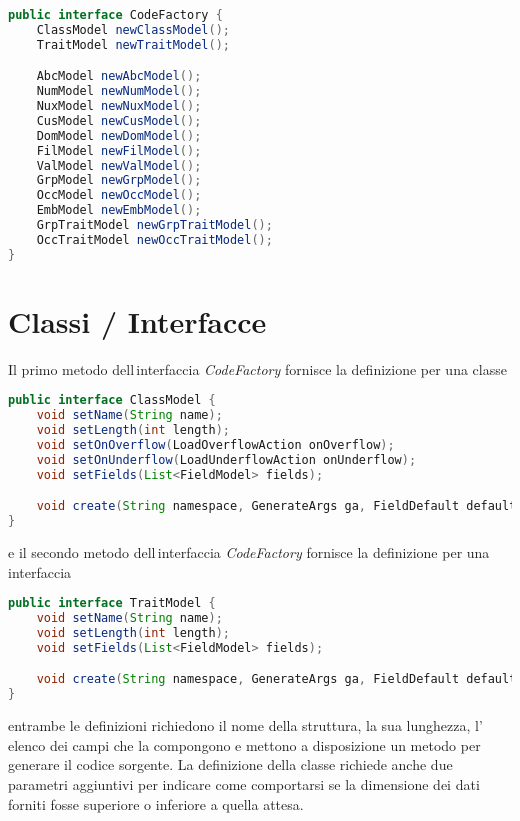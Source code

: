 \documentclass[a4paper,10pt]{report}
\begin{document}
\begin{figure*}[!htb]
\begin{lstlisting}[language=java, caption=interfaccia CodeFactory, 
label=code:CodeFactory]
public interface CodeFactory {
    ClassModel newClassModel();
    TraitModel newTraitModel();

    AbcModel newAbcModel();
    NumModel newNumModel();
    NuxModel newNuxModel();
    CusModel newCusModel();
    DomModel newDomModel();
    FilModel newFilModel();
    ValModel newValModel();
    GrpModel newGrpModel();
    OccModel newOccModel();
    EmbModel newEmbModel();
    GrpTraitModel newGrpTraitModel();
    OccTraitModel newOccTraitModel();
}
\end{lstlisting}
\end{figure*}

\section{Classi / Interfacce}
Il primo metodo dell\,interfaccia \textsl{CodeFactory} fornisce la definizione 
per una classe

\begin{lstlisting}[language=java, caption=interfaccia ClassModel, 
label=code:ClassModel]
public interface ClassModel {
    void setName(String name);
    void setLength(int length);
    void setOnOverflow(LoadOverflowAction onOverflow);
    void setOnUnderflow(LoadUnderflowAction onUnderflow);
    void setFields(List<FieldModel> fields);

    void create(String namespace, GenerateArgs ga, FieldDefault defaults);
}
\end{lstlisting}

\noindent e il secondo metodo dell\,interfaccia \textsl{CodeFactory} fornisce la 
definizione per una interfaccia

\begin{lstlisting}[language=java, caption=interfaccia TraitModel, 
label=code:TraitModel]
public interface TraitModel {
    void setName(String name);
    void setLength(int length);
    void setFields(List<FieldModel> fields);

    void create(String namespace, GenerateArgs ga, FieldDefault defaults);
}
\end{lstlisting}
\noindent entrambe le definizioni richiedono il nome della struttura, la sua
lunghezza, l'\,elenco dei campi che la compongono e mettono a disposizione
un metodo per generare il codice sorgente.
La definizione della classe richiede anche due parametri aggiuntivi per indicare
come comportarsi se la dimensione dei dati forniti fosse superiore o inferiore a
quella attesa.
\end{document}
